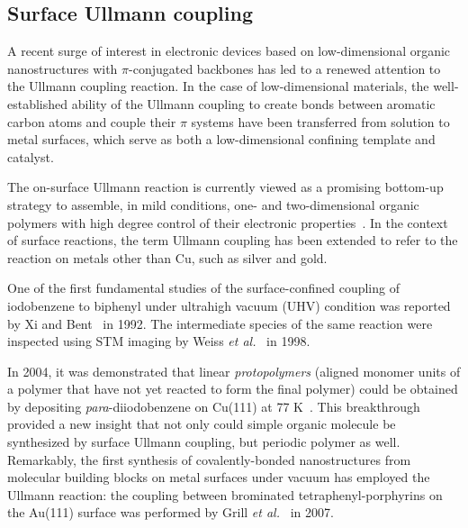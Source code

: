 \documentclass[%
 reprint,
 amsmath,amssymb,
 aps,
prb,
]{revtex4-1}
\begin{document}

\subsection{Surface Ullmann coupling}

A recent surge of interest in electronic devices based on low-dimensional organic nanostructures with $\pi$-conjugated backbones has led to a renewed attention to the Ullmann coupling reaction. 
In the case of low-dimensional materials, the well-established ability of the Ullmann coupling to create bonds between aromatic carbon atoms and couple their $\pi$ systems have been transferred from solution to metal surfaces, which serve as both a low-dimensional confining template and catalyst.

The on-surface Ullmann reaction is currently viewed as a promising bottom-up strategy to assemble, in mild conditions, one- and two-dimensional organic polymers with high degree control of their electronic properties~\cite{ullmann_33}. 
In the context of surface reactions, the term Ullmann coupling has been extended to refer to the reaction on metals other than Cu, such as silver and gold. 

One of the first fundamental studies of the surface-confined coupling of iodobenzene to biphenyl under ultrahigh vacuum (UHV) condition was reported by Xi and Bent~\cite{sur_sci01} in 1992.
%
The intermediate species of the same reaction were inspected using STM imaging by Weiss \textit{et al.}~\cite{langm01} in 1998.
%

In 2004, it was demonstrated that linear \emph{protopolymers} (aligned monomer units of a polymer that have not yet reacted to form the final polymer) could be obtained by depositing \textit{para}-diiodobenzene on Cu(111) at 77 K~\cite{jacs01}. This breakthrough provided a new insight that not only could simple organic molecule be synthesized by surface Ullmann coupling, but periodic polymer as well.
Remarkably, the first synthesis of covalently-bonded nanostructures from molecular building blocks on metal surfaces under vacuum has employed the Ullmann reaction: the coupling between brominated tetraphenyl-porphyrins on the Au(111) surface was performed by Grill \textit{et al.}~\cite{Naturenano2007} in 2007.
\end{document}
